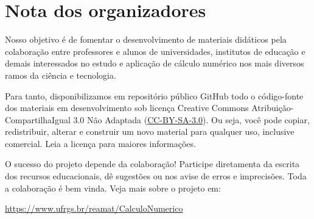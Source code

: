 
\chapter*{Nota dos organizadores}

Nosso objetivo é de fomentar o desenvolvimento de materiais didáticos pela colaboração entre professores e alunos de universidades, institutos de educação e demais interessados no estudo e aplicação de cálculo numérico nos mais diversos ramos da ciência e tecnologia.

Para tanto, disponibilizamos em repositório público GitHub todo o código-fonte dos materiais em desenvolvimento sob licença Creative Commons Atribuição-CompartilhaIgual 3.0 Não Adaptada (\href{https://creativecommons.org/licenses/by-sa/3.0/}{CC-BY-SA-3.0}). Ou seja, você pode copiar, redistribuir, alterar e construir um novo material para qualquer uso, inclusive comercial. Leia a licença para maiores informações.

O sucesso do projeto depende da colaboração! Participe diretamenta da escrita dos recursos educacionais, dê sugestões ou nos avise de erros e imprecisões. Toda a colaboração é bem vinda. Veja mais sobre o projeto em:
\begin{center}
  \url{https://www.ufrgs.br/reamat/CalculoNumerico}
\end{center}



